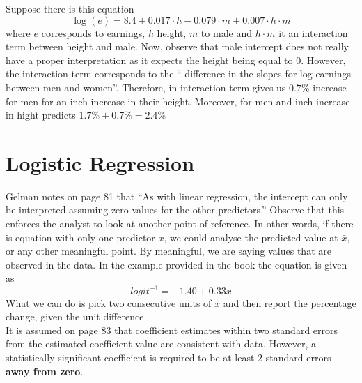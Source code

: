 \documentclass{article}
\begin{document}
Suppose there is this equation
\begin{equation}
\log(e) = 8.4+0.017 \cdot h - 0.079 \cdot m + 0.007 \cdot h \cdot m 
\end{equation}
where $e$ corresponds to earnings, $h$ height, $m$ to male and $h \cdot m $ it an interaction term between height and male. Now, observe that male intercept does not really have a proper interpretation as it expects the height being equal to 0. However, the interaction term corresponds to the `` difference in the slopes for log earnings between men and women''. Therefore, in interaction term gives us $0.7\%$ increase for men for an inch increase in their height. Moreover, for men and inch increase in hight predicts $1.7\% + 0.7\% = 2.4\%$

\section{Logistic Regression}
Gelman notes on page 81 that ``As with linear regression, the intercept can only be interpreted assuming zero values for the other predictors.'' Observe that this enforces the analyst to look at another point of reference. In other words, if there is equation with only one predictor $x$, we could analyse the predicted value at $\bar{x}$, or any other meaningful point. By meaningful, we are saying values that are observed in the data. In the example provided in the book the equation is given as 
\begin{equation}
logit^{-1} = -1.40 + 0.33x
\end{equation}
What we can do is pick two consecutive units of $x$ and then report the percentage change, given the unit difference
\\
\indent
It is assumed on page 83 that coefficient estimates within two standard errors from the estimated coefficient value are consistent with data. However, a statistically significant coefficient is required to be at least 2 standard errors \textbf{away from zero}.
\end{document}
